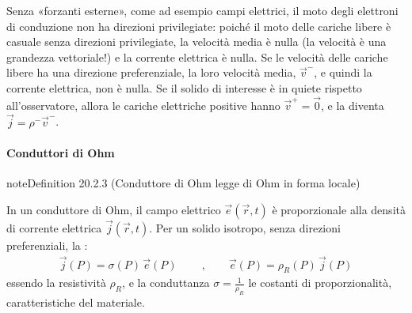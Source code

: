 \documentclass[letterpaper,10pt,italian]{jupyterBook}
\begin{document}
\sphinxAtStartPar
Senza «forzanti esterne», come ad esempio campi elettrici, il moto degli elettroni di conduzione non ha direzioni privilegiate: poiché il moto delle cariche libere è casuale senza direzioni privilegiate, la velocità media è nulla (la velocità è una grandezza vettoriale!) e la corrente elettrica è nulla. Se le velocità delle cariche libere ha una direzione preferenziale, la loro velocità media, \(\vec{v}^-\), e quindi la corrente elettrica, non è nulla. Se il solido di interesse è in quiete rispetto all’osservatore, allora le cariche elettriche positive hanno \(\vec{v}^+ = \vec{0}\), e la {\hyperref[\detokenize{ch/electromagnetism/electric-current:electric-current-density-def}]{}} diventa \(\vec{j} = \rho^- \vec{v}^-\).




\paragraph{Conduttori di Ohm}
\label{\detokenize{ch/electromagnetism/electric-current:conduttori-di-ohm}}\label{\detokenize{ch/electromagnetism/electric-current:physics-hs-electromagnetism-electric-current-solids-conductor-ohm}}\label{ch/electromagnetism/electric-current:definition-2}
\begin{sphinxadmonition}{note}{Definition 20.2.3 (Conduttore di Ohm \sphinxhyphen{} legge di Ohm in forma locale)}



\sphinxAtStartPar
In un conduttore di Ohm, il campo elettrico \(\vec{e}(\vec{r},t)\) è proporzionale alla densità di corrente elettrica \(\vec{j}(\vec{r},t)\). Per un solido isotropo, senza direzioni preferenziali, la :
\begin{equation}\label{equation:ch/electromagnetism/electric-current:ohm:local}
\begin{split}
\vec{j}(P) = \sigma(P) \, \vec{e}(P)
\qquad \ , \qquad
\vec{e}(P) = \rho_R(P) \, \vec{j}(P)
\end{split}
\end{equation}
\sphinxAtStartPar
essendo la resistività \(\rho_R\), e la conduttanza \(\sigma = \frac{1}{\rho_R}\) le costanti di proporzionalità, caratteristiche del materiale.
\end{sphinxadmonition}
\end{document}
